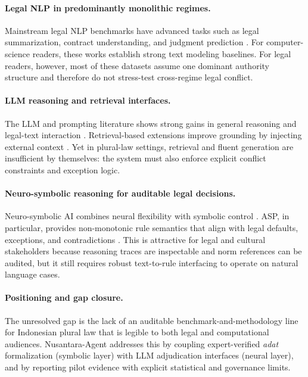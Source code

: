 \documentclass[11pt]{article}
\begin{document}
\paragraph{Legal NLP in predominantly monolithic regimes.}
Mainstream legal NLP benchmarks have advanced tasks such as legal summarization, contract understanding, and judgment prediction \cite{guha2023legalbench,colombo2024saullm,sie-etal-2024-summarizing,liu-etal-2024-enhancing-legal,nigam-etal-2024-rethinking,xie-etal-2024-clc,mali-etal-2024-information,narendra-etal-2024-enhancing,hou-etal-2024-gaps,kwak-etal-2024-classify,taranukhin-etal-2024-empowering,tran-etal-2024-deberta,tyss-etal-2024-lexsumm,tyss-etal-2024-supporting}. For computer-science readers, these works establish strong text modeling baselines. For legal readers, however, most of these datasets assume one dominant authority structure and therefore do not stress-test cross-regime legal conflict.

\paragraph{LLM reasoning and retrieval interfaces.}
The LLM and prompting literature shows strong gains in general reasoning and legal-text interaction \cite{vaswani2017attention,brown2020language,wei2022cot,wang2022selfconsistency,yao2023react,yao2023tree,shinn2023reflexion}. Retrieval-based extensions improve grounding by injecting external context \cite{lewis2020rag,asai2023selfrag,gao2023ragsurvey,sarthi2024raptor,he2024gretriever}. Yet in plural-law settings, retrieval and fluent generation are insufficient by themselves: the system must also enforce explicit conflict constraints and exception logic.

\paragraph{Neuro-symbolic reasoning for auditable legal decisions.}
Neuro-symbolic AI combines neural flexibility with symbolic control \cite{garcez2023neurosymbolic}. ASP, in particular, provides non-monotonic rule semantics that align with legal defaults, exceptions, and contradictions \cite{lifschitz2019asp,gebser2014clingo}. This is attractive for legal and cultural stakeholders because reasoning traces are inspectable and norm references can be audited, but it still requires robust text-to-rule interfacing to operate on natural language cases.

\paragraph{Positioning and gap closure.}
The unresolved gap is the lack of an auditable benchmark-and-methodology line for Indonesian plural law that is legible to both legal and computational audiences. Nusantara-Agent addresses this by coupling expert-verified \textit{adat} formalization (symbolic layer) with LLM adjudication interfaces (neural layer), and by reporting pilot evidence with explicit statistical and governance limits.
\end{document}
